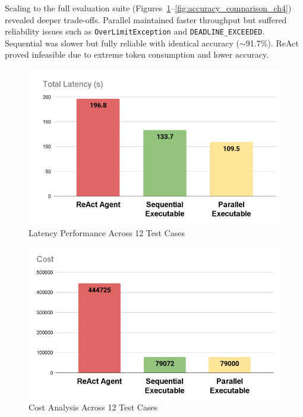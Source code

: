 \begin{spacing}{1.2}
Scaling to the full evaluation suite (Figures~\ref{fig:latency_comparison_ch4}--\ref{fig:accuracy_comparison_ch4}) 
revealed deeper trade-offs. Parallel maintained faster throughput but suffered reliability issues such as 
\texttt{OverLimitException} and \texttt{DEADLINE\_EXCEEDED}. Sequential was slower but fully reliable with identical 
accuracy ($\sim$91.7\%). ReAct proved infeasible due to extreme token consumption and lower accuracy.

\begin{figure}[H]
\centering
\includegraphics[scale=0.5]{images/latency.png}
\caption{Latency Performance Across 12 Test Cases}
\label{fig:latency_comparison_ch4}
\end{figure}

\begin{figure}[H]
\centering
\includegraphics[scale=0.5]{images/cost.png}
\caption{Cost Analysis Across 12 Test Cases}
\label{fig:cost_comparison_ch4}
\end{figure}


\end{spacing}
